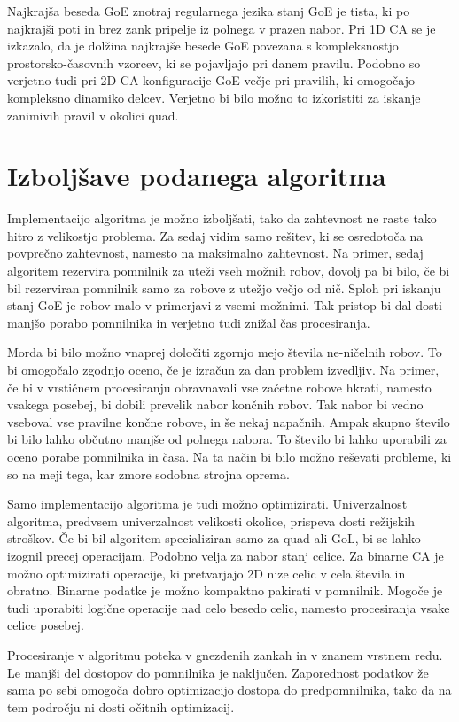 \documentclass[12pt,a4paper,openany,twoside]{book}
\begin{document}
Najkrajša beseda GoE znotraj regularnega jezika stanj GoE je tista,
ki po najkrajši poti in brez zank pripelje iz polnega v prazen nabor.
Pri 1D CA se je izkazalo, da je dolžina najkrajše besede GoE povezana s kompleksnostjo
prostorsko-časovnih vzorcev, ki se pojavljajo pri danem pravilu.
Podobno so verjetno tudi pri 2D CA konfiguracije GoE večje pri pravilih,
ki omogočajo kompleksno dinamiko delcev. Verjetno bi bilo možno to izkoristiti
za iskanje zanimivih pravil v okolici quad.

\section{Izboljšave podanega algoritma}

Implementacijo algoritma je možno izboljšati, tako da zahtevnost
ne raste tako hitro z velikostjo problema.
Za sedaj vidim samo rešitev, ki se osredotoča na povprečno zahtevnost, namesto na maksimalno zahtevnost.
Na primer, sedaj algoritem rezervira pomnilnik za uteži vseh možnih robov,
dovolj pa bi bilo, če bi bil rezerviran pomnilnik samo za robove z utežjo večjo od nič.
Sploh pri iskanju stanj GoE je robov malo v primerjavi z vsemi možnimi.
Tak pristop bi dal dosti manjšo porabo pomnilnika
in verjetno tudi znižal čas procesiranja.

Morda bi bilo možno vnaprej določiti zgornjo mejo števila ne-ničelnih robov.
To bi omogočalo zgodnjo oceno, če je izračun za dan problem izvedljiv.
Na primer, če bi v vrstičnem procesiranju obravnavali vse začetne robove hkrati,
namesto vsakega posebej, bi dobili prevelik nabor končnih robov.
Tak nabor bi vedno vseboval vse pravilne končne robove, in še nekaj napačnih.
Ampak skupno število bi bilo lahko občutno manjše od polnega nabora.
To število bi lahko uporabili za oceno porabe pomnilnika in časa.
Na ta način bi bilo možno reševati probleme, ki so na meji tega,
kar zmore sodobna strojna oprema.

Samo implementacijo algoritma je tudi možno optimizirati.
Univerzalnost algoritma, predvsem univerzalnost velikosti okolice,
prispeva dosti režijskih stroškov. Če bi bil algoritem specializiran
samo za quad ali GoL, bi se lahko izognil precej operacijam.
Podobno velja za nabor stanj celice. Za binarne CA je možno optimizirati
operacije, ki pretvarjajo 2D nize celic v cela števila in obratno.
Binarne podatke je možno kompaktno pakirati v pomnilnik.
Mogoče je tudi uporabiti logične operacije nad celo besedo celic,
namesto procesiranja vsake celice posebej.

Procesiranje v algoritmu poteka v gnezdenih zankah in v znanem vrstnem redu.
Le manjši del dostopov do pomnilnika je naključen.
Zaporednost podatkov že sama po sebi omogoča dobro optimizacijo dostopa do predpomnilnika,
tako da na tem področju ni dosti očitnih optimizacij.
\end{document}
